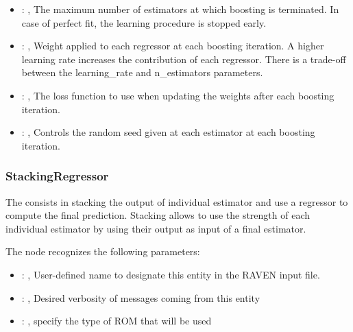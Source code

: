 \begin{itemize}
    \item {}: ,
      The maximum number of estimators at which boosting is
      terminated. In case of perfect fit, the learning procedure is
      stopped early.

    \item {}: ,
      Weight applied to each regressor at each boosting iteration.
      A higher learning rate increases the contribution of each regressor.
      There is a trade-off between the learning\_rate and n\_estimators
      parameters.

    \item {}: ,
      The loss function to use when updating the weights after each
      boosting iteration.

    \item {}: ,
      Controls the random seed given at each estimator at each
      boosting iteration.
  \end{itemize}


\subsubsection{StackingRegressor}
  The  consists in stacking the output of individual estimator and
  use a regressor to compute the final prediction. Stacking allows to use the strength of each
  individual estimator by using their output as input of a final estimator.

  The  node recognizes the following parameters:
    \begin{itemize}
      \item {}: ,
        User-defined name to designate this entity in the RAVEN input file.
      \item {}: ,
        Desired verbosity of messages coming from this entity
      \item {}: ,
        specify the type of ROM that will be used
  \end{itemize}

